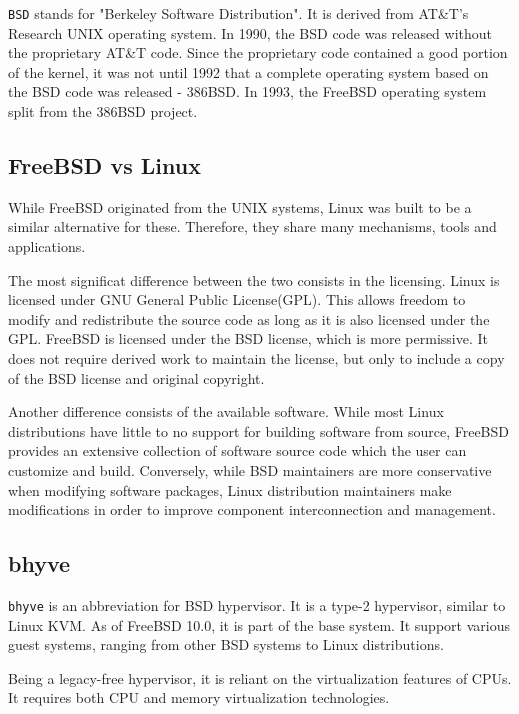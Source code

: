 
\texttt{BSD} stands for "Berkeley Software Distribution". It is derived from AT\&T's Research UNIX operating system. In 1990, the BSD code was released without the proprietary AT\&T code.
Since the proprietary code contained a good portion of the kernel, it was not until 1992 that a complete operating system based on the BSD code was released - 386BSD. In 1993, the FreeBSD operating system split from the 386BSD project\cite{bsd}. 

\subsection{FreeBSD vs Linux}
\label{subsec:bsdlinux}

While FreeBSD originated from the UNIX systems, Linux was built to be a similar alternative for these. Therefore, they share many mechanisms, tools and applications.

The most significat difference between the two consists in the licensing. Linux is licensed under GNU General Public License(GPL)\cite{gnu}. This allows freedom to modify and redistribute the source code as long as it is also licensed under the GPL. FreeBSD is licensed under the BSD license, which is more permissive. It does not require derived work to maintain the license, but only to include a copy of the BSD license and original copyright\cite{bsd-license}.

Another difference consists of the available software. While most Linux distributions have little to no support for building software from source, FreeBSD provides an extensive collection of software source code which the user can customize and build. Conversely, while BSD maintainers are more conservative when modifying software packages, Linux distribution maintainers make modifications in order to improve component interconnection and management\cite{comp-bsd-linux}.

\subsection{bhyve}
\label{subsec:bhyve}

\texttt{bhyve} is an abbreviation for BSD hypervisor. It is a type-2 hypervisor, similar to Linux KVM. As of FreeBSD 10.0, it is part of the base system. It support various guest systems, ranging from other BSD systems to Linux distributions\cite{intr-bhyve}.

Being a legacy-free hypervisor, it is reliant on the virtualization features of CPUs. It requires both CPU and memory virtualization technologies.

